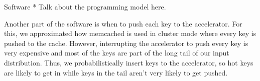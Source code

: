 \begin{block}{Software}
* Talk about the programming model here.

Another part of the software is when to push each key to the accelerator. For
this, we approximated how memcached is used in cluster mode where every key is
pushed to the cache. However, interrupting the accelerator to push every key is
very expensive and most of the keys are part of the long tail of our input
distribution. Thus, we probabilistically insert keys to the accelerator, so hot
keys are likely to get in while keys in the tail aren't very likely to get
pushed.

\end{block}

